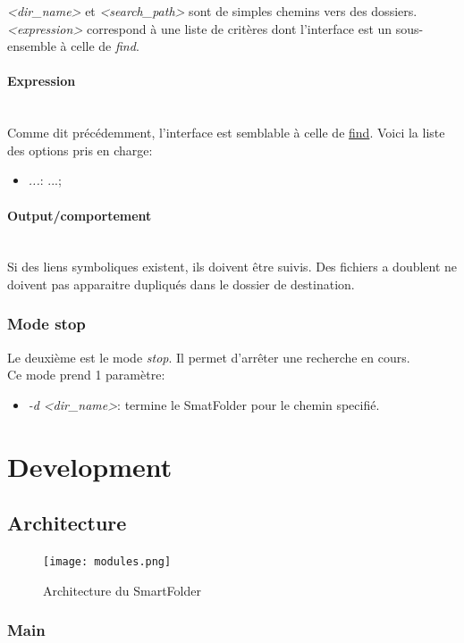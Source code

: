 \documentclass[11pt, a4paper]{article}
\newcommand{\paragraphnl}[1]{\paragraph{#1}\mbox{}\\}
\begin{document}
\textit{<dir\_name>} et \textit{<search\_path>} sont de simples chemins vers des dossiers.\\
\textit{<expression>} correspond à une liste de critères dont l'interface est un sous-ensemble à celle de \textit{find}.

\paragraphnl{Expression}
Comme dit précédemment, l'interface est semblable à celle de \href{https://linux.die.net/man/1/find}{find}.
Voici la liste des options pris en charge:

\begin{itemize}
    \item \textit{...}: ...;
\end{itemize}

\paragraphnl{Output/comportement}

Si des liens symboliques existent, ils doivent être suivis. Des fichiers a doublent ne doivent pas apparaitre dupliqués dans le dossier de destination.

\subsubsection{Mode stop}
Le deuxième est le mode \textit{stop}.
Il permet d'arrêter une recherche en cours. \\

Ce mode prend 1 paramètre:
\begin{itemize}
    \item \textit{-d} \textit{<dir\_name>}: termine le SmatFolder pour le chemin specifié.
\end{itemize}

\newpage

\section{Development}
\subsection{Architecture}

\begin{figure}[H]
    \begin{center}
        \texttt{[image: modules.png]}
    \end{center}
    \caption{Architecture du SmartFolder}
    \label{Architecture du SmartFolder}
\end{figure}

\subsubsection{Main}
\end{document}
